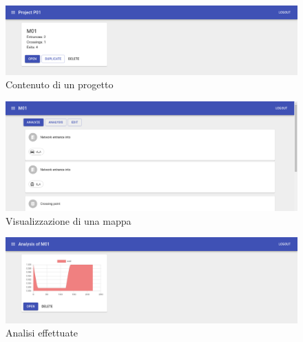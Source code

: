 \begin{figure}[h]
	\centering
	\includegraphics[width=\textwidth]{img/screen02}
	\caption{Contenuto di un progetto}
	\label{fig:screen02}
\end{figure}

\begin{figure}[h]
	\centering
	\includegraphics[width=\textwidth]{img/screen03}
	\caption{Visualizzazione di una mappa}
	\label{fig:screen03}
\end{figure}


\begin{figure}[h]
	\centering
	\includegraphics[width=\textwidth]{img/screen04}
	\caption{Analisi effettuate}
	\label{fig:screen04}
\end{figure}

